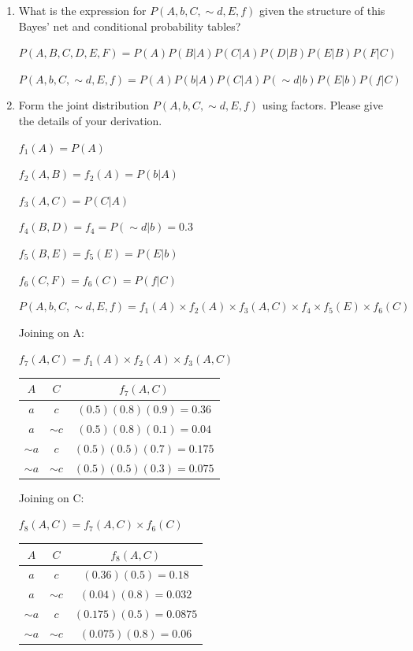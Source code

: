 \documentclass[12pt]{article}
\begin{document}
\begin{enumerate}

\item What is the expression for $P(A,b,C, \sim d,E,f)$ given the structure
  of this Bayes' net and conditional probability tables?

$P(A,B,C,D,E,F) = P(A) P(B|A) P(C|A) P(D|B)P(E|B) P(F|C)$

$P(A,b,C, \sim d,E,f) = P(A) P(b|A) P(C|A) P(\sim d|b) P(E|b) P(f|C)$


\item Form the joint distribution $P(A,b,C, \sim d,E,f)$ using factors.  Please give the
  details of your derivation.

$f_1(A) = P(A)$

$f_2(A,B) = f_2(A) = P(b|A)$

$f_3(A,C) = P(C|A)$

$f_4(B,D) = f_4 = P(\sim d|b) = 0.3$

$f_5(B,E) = f_5(E) = P(E|b)$

$f_6(C,F) = f_6(C) = P(f|C)$

$P(A,b,C, \sim d,E,f) = f_1(A) \times f_2(A) \times f_3(A,C) \times f_4 \times f_5(E) \times f_6(C)$

Joining on A:

$f_7(A,C) = f_1(A) \times f_2(A) \times f_3(A,C)$

\begin{center}
	\begin{tabular}{|c|c|c|}
		\hline
		$A$ & $C$ & $f_7(A,C)$ \\
		\hline
		$a$ & $c$ & $(0.5)(0.8)(0.9) = 0.36$ \\
		\hline
		$a$ & $\sim c$ & $(0.5)(0.8)(0.1) = 0.04$ \\
		\hline
		$\sim a$ & $c$ & $(0.5)(0.5)(0.7) = 0.175$ \\
		\hline
		$\sim a$ & $\sim c$ & $(0.5)(0.5)(0.3) = 0.075$ \\
		\hline
	\end{tabular}
\end{center}

Joining on C:

$f_8(A,C) = f_7(A,C) \times f_6(C)$

\begin{center}
	\begin{tabular}{|c|c|c|}
		\hline
		$A$ & $C$ & $f_8(A,C)$ \\
		\hline
		$a$ & $c$ & $(0.36)(0.5) = 0.18$ \\
		\hline
		$a$ & $\sim c$ & $(0.04)(0.8) = 0.032$ \\
		\hline
		$\sim a$ & $c$ & $(0.175)(0.5) = 0.0875$ \\
		\hline
		$\sim a$ & $\sim c$ & $(0.075)(0.8) = 0.06$ \\
		\hline
	\end{tabular}
\end{center}


\end{enumerate}
\end{document}
